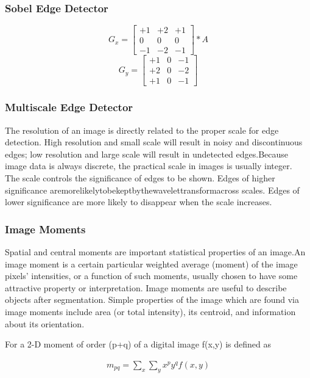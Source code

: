 \subsubsection{Sobel Edge Detector}

\[
G_{x}=
 \begin{bmatrix}
  +1 &+2 &+1 \\
  0 & 0 & 0 \\
  -1 & -2 & -1
 \end{bmatrix} *A
\]
\[
G_{y}=
 \begin{bmatrix}
  +1 & 0 & -1 \\
  +2 & 0 & -2 \\
  +1 & 0 & -1
 \end{bmatrix}
\]

\subsubsection {Multiscale Edge Detector}
The resolution of an image is directly related to the proper scale for edge detection. High
resolution and small scale will result in noisy and discontinuous edges; low resolution and
large scale will result in undetected edges.Because image data is always discrete, the practical scale in images is usually integer.
\\
The scale controls the significance of edges to be shown. Edges of higher significance
aremorelikelytobekeptbythewavelettransformacross scales. Edges of lower significance
are more likely to disappear when the scale increases.

\subsubsection {Image Moments}
Spatial and central moments are important statistical properties of an image.An image moment is a certain particular weighted average (moment) of the image pixels' intensities, or a function of such moments, usually chosen to have some attractive property or interpretation.
Image moments are useful to describe objects after segmentation. Simple properties of the image which are found via image moments include area (or total intensity), its centroid, and information about its orientation.

\par
For a 2-D moment of order (p+q) of a digital image f(x,y) is defined as

\begin{align}  m_{pq}=  \sum_{x} \sum_{y} x^p y^q f(x,y)  \end{align}
 
